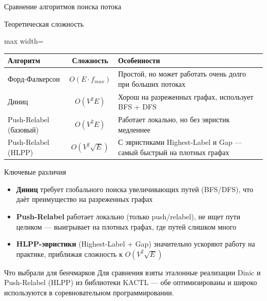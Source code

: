 \documentclass[14pt, aspectratio=169]{beamer}
\begin{document}
\begin{frame}{Сравнение алгоритмов поиска потока}
\scriptsize

\begin{block}{Теоретическая сложность}
\begin{adjustbox}{max width=\textwidth}
\begin{tabular}{|l|c|l|}
\hline
\textbf{Алгоритм} & \textbf{Сложность} & \textbf{Особенности} \\
\hline
Форд-Фалкерсон & $O(E \cdot f_{max})$ & Простой, но может работать очень долго при больших потоках \\
\hline
Диниц & $O(V^2 E)$ & Хорош на разреженных графах, использует BFS + DFS \\
\hline
Push-Relabel (базовый) & $O(V^2 E)$ & Работает локально, но без эвристик медленнее \\
\hline
Push-Relabel (HLPP) & $O(V^2 \sqrt{E})$ & С эвристиками Highest-Label и Gap — самый быстрый на плотных графах \\
\hline
\end{tabular}
\end{adjustbox}
\end{block}

\begin{block}{Ключевые различия}
\begin{itemize}
\item \textbf{Диниц} требует глобального поиска увеличивающих путей (BFS/DFS), что даёт преимущество на разреженных графах
\item \textbf{Push-Relabel} работает локально (только push/relabel), не ищет пути целиком — выигрывает на плотных графах, где путей слишком много
\item \textbf{HLPP-эвристики} (Highest-Label + Gap) значительно ускоряют работу на практике, приближая сложность к $O(V^2 \sqrt{E})$
\end{itemize}
\end{block}

\begin{block}{Что выбрали для бенчмарков}
Для сравнения взяты эталонные реализации Dinic и Push-Relabel (HLPP) из библиотеки KACTL — обе оптимизированы и широко используются в соревновательном программировании.
\end{block}

\end{frame}
\end{document}
